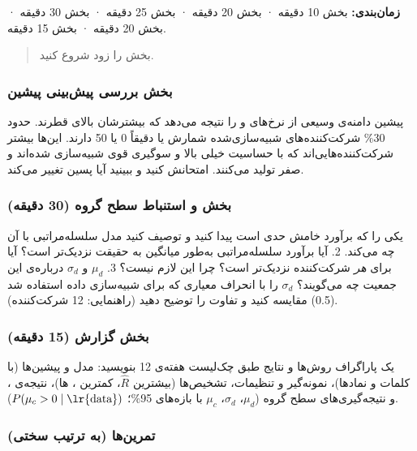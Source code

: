 \textbf{زمان‌بندی:} بخش  10 دقیقه · بخش  20 دقیقه · بخش
 25 دقیقه · بخش  30 دقیقه · بخش  20 دقیقه · بخش 
15 دقیقه.

\begin{quote}
بخش  را زود شروع کنید.
\end{quote}

\subsubsection{\texorpdfstring{بخش بررسی پیش‌بینی پیشین}{بخش B: بررسی پیش‌بینی پیشین}}

پیشین دامنه‌ی وسیعی از نرخ‌های  و  را نتیجه می‌دهد
که بیشترشان بالای قطرند. حدود 30\% شرکت‌کننده‌های شبیه‌سازی‌شده شمارش
 یا  دقیقاً 0 یا 50 دارند. این‌ها بیشتر
شرکت‌کننده‌هایی‌اند که با حساسیت خیلی بالا و سوگیری قوی شبیه‌سازی شده‌اند و
 صفر تولید می‌کنند. امتحانش کنید و ببینید آیا پسین تغییر
می‌کند.

\subsubsection{\texorpdfstring{بخش  و استنباط سطح گروه
(30 دقیقه)}{بخش D: shrinkage و استنباط سطح گروه (30 دقیقه)}}

یکی را که برآورد خامش حدی است پیدا کنید و توصیف کنید مدل سلسله‌مراتبی با
آن چه می‌کند. 2. آیا برآورد سلسله‌مراتبی به‌طور میانگین به حقیقت نزدیک‌تر
است؟ آیا برای \emph{هر} شرکت‌کننده نزدیک‌تر است؟ چرا این لازم نیست؟ 3.
\(\mu_d\) و \(\sigma_d\) درباره‌ی این جمعیت چه می‌گویند؟ \(\sigma_d\) را
با انحراف معیاری که برای شبیه‌سازی داده استفاده شد (0.5) مقایسه کنید و
تفاوت را توضیح دهید (راهنمایی: 12 شرکت‌کننده).

\subsubsection{\texorpdfstring{بخش  گزارش (15
دقیقه)}{بخش F: گزارش (15 دقیقه)}}

یک پاراگراف روش‌ها و نتایج طبق چک‌لیست هفته‌ی 12 بنویسید: مدل و پیشین‌ها (با
کلمات و نمادها)، نمونه‌گیر و تنظیمات، تشخیص‌ها (بیشترین \(\hat R\)، کمترین
، ها)، نتیجه‌ی ، و نتیجه‌گیری‌های سطح گروه
(\(\mu_d\)، \(\sigma_d\)، \(\mu_c\) با بازه‌های 95\%؛
\(P(\mu_c > 0\mid\text{\lr{data}})\)).

\subsubsection{تمرین‌ها (به ترتیب سختی)}

